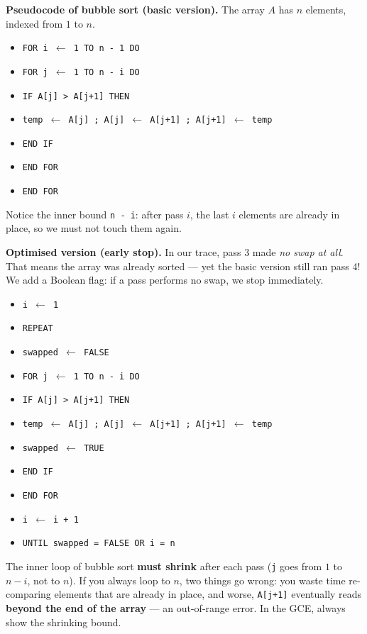 \documentclass[11pt]{article}
\begin{document}
\textbf{Pseudocode of bubble sort (basic version).} The array $A$ has $n$ elements, indexed from $1$ to $n$.

\begin{itemize}
\item[] \texttt{FOR i $\leftarrow$ 1 TO n - 1 DO}
\item[] \texttt{\quad FOR j $\leftarrow$ 1 TO n - i DO}
\item[] \texttt{\quad\quad IF A[j] > A[j+1] THEN}
\item[] \texttt{\quad\quad\quad temp $\leftarrow$ A[j] ; A[j] $\leftarrow$ A[j+1] ; A[j+1] $\leftarrow$ temp}
\item[] \texttt{\quad\quad END IF}
\item[] \texttt{\quad END FOR}
\item[] \texttt{END FOR}
\end{itemize}

Notice the inner bound \texttt{n - i}: after pass $i$, the last $i$ elements are already in place, so we must not touch them again.

\textbf{Optimised version (early stop).} In our trace, pass 3 made \emph{no swap at all}. That means the array was already sorted --- yet the basic version still ran pass 4! We add a Boolean flag: if a pass performs no swap, we stop immediately.

\begin{itemize}
\item[] \texttt{i $\leftarrow$ 1}
\item[] \texttt{REPEAT}
\item[] \texttt{\quad swapped $\leftarrow$ FALSE}
\item[] \texttt{\quad FOR j $\leftarrow$ 1 TO n - i DO}
\item[] \texttt{\quad\quad IF A[j] > A[j+1] THEN}
\item[] \texttt{\quad\quad\quad temp $\leftarrow$ A[j] ; A[j] $\leftarrow$ A[j+1] ; A[j+1] $\leftarrow$ temp}
\item[] \texttt{\quad\quad\quad swapped $\leftarrow$ TRUE}
\item[] \texttt{\quad\quad END IF}
\item[] \texttt{\quad END FOR}
\item[] \texttt{\quad i $\leftarrow$ i + 1}
\item[] \texttt{UNTIL swapped = FALSE OR i = n}
\end{itemize}

\begin{attention}
The inner loop of bubble sort \textbf{must shrink} after each pass (\texttt{j} goes from $1$ to $n-i$, not to $n$). If you always loop to $n$, two things go wrong: you waste time re-comparing elements that are already in place, and worse, \texttt{A[j+1]} eventually reads \textbf{beyond the end of the array} --- an out-of-range error. In the GCE, always show the shrinking bound.
\end{attention}
\end{document}
